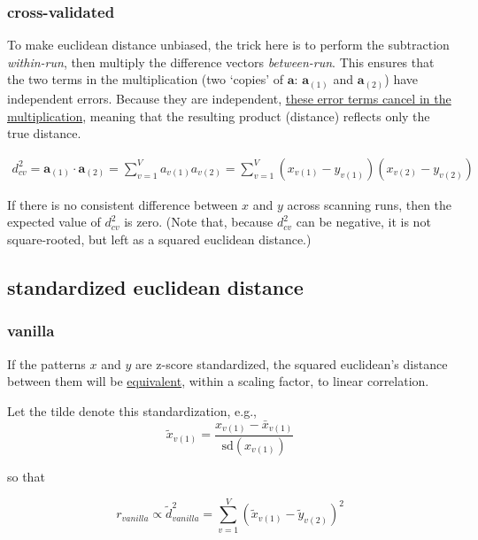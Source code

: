 \documentclass{article}\usepackage[]{graphicx}\usepackage[]{color}
\begin{document}
\subsubsection*{cross-validated}

To make euclidean distance unbiased, the trick here is to perform the subtraction \textit{within-run}, then multiply the difference vectors \textit{between-run}.
This ensures that the two terms in the multiplication (two `copies' of $\mathbf{a}$: $\mathbf{a}_{(1)}$ and $\mathbf{a}_{(2)}$) have independent errors.
Because they are independent, \href{https://www.biorxiv.org/content/10.1101/032391v2}{these error terms cancel in the multiplication}, meaning that the resulting product (distance) reflects only the true distance.

\begin{align}
  d^2_\textit{cv} = \mathbf{a}_{(1)} \cdot \mathbf{a}_{(2)} = \sum_{v = 1}^V a_{v{(1)}}a_{v{(2)}} = \sum_{v = 1}^{V}(x_{v(1)} - y_{v(1)})(x_{v(2)} - y_{v(2)})
\end{align}

If there is no consistent difference between $x$ and $y$ across scanning runs, then the expected value of $d^2_\textit{cv}$ is zero.
(Note that, because $d^2_\textit{cv}$ can be negative, it is not square-rooted, but left as a squared euclidean distance.)


\subsection*{standardized euclidean distance}

\subsubsection*{vanilla}

If the patterns $x$ and $y$ are z-score standardized, the squared euclidean's distance between them will be \href{https://arxiv.org/abs/1601.02213}{equivalent}, within a scaling factor, to linear correlation.

Let the tilde denote this standardization, e.g.,
\[
\widetilde{x}_{v(1)} =
\frac{x_{v(1)} - \bar{x}_{v(1)}}
{\text{sd}(x_{v(1)})}
\]

so that

\begin{equation}
  r_\textit{vanilla} \propto \widetilde{d}^2_\textit{vanilla} = \sum_{v = 1}^{V}(\widetilde{x}_{v(1)} - \widetilde{y}_{v(2)})^2
\end{equation}
\end{document}
